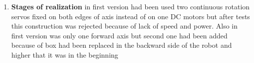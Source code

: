 \begin{enumerate}
      Inclined plane made from aluminium plates, slopes made from aluminium and plastic. For calculations of angles, lengths had been used GeoGebra (figure \ref{Gripper800}).
      \begin{figure}[H]
      	\begin{minipage}[h]{1\linewidth}
      		\caption{GeoGeabra workspace with open scheme оf gripper}
      		\label{Gripper800}
      	\end{minipage}
      \end{figure}
      
  \item
    \textbf{Stages of realization}
      in first version had been used two continuous rotation servos fixed on both edges of axis instead of on one DC motors but after tests this construction was rejected because of lack 
      of speed and power. Also in first version was only one forward axis but second one had been added because of box had been replaced in the backward side of the robot and higher that 
      it was in the beginning  
\end{enumerate}

\fillpage